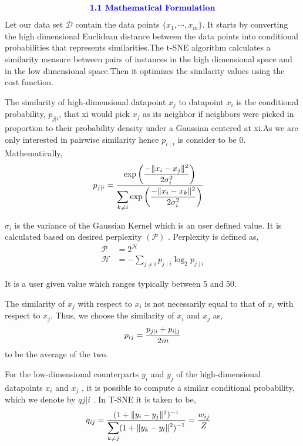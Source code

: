 \documentclass[12pt,a4paper]{article}
\begin{document}
{\begin{align*}
    \textcolor{blue}{\text{{\textbf{1.1 Mathematical Formulation}}}}
\end{align*}
Let our data set $\mathcal{D}$ contain the data points $\{x_1,\cdots,x_m\}$. It starts by converting the high dimensional Euclidean distance between the data points into conditional probabilities that represents similarities.The t-SNE algorithm calculates a similarity measure between pairs of instances in the high dimensional space and in the low dimensional space.Then it optimizes the similarity values using the cost function.

The similarity of high-dimensional datapoint $x_j$ to datapoint $x_i$ is the conditional probability, $p_{j|i}$, that xi would pick $x_j$ as its neighbor if neighbors were picked in proportion to their probability density under a Gaussian centered at xi.As we are only interested in pairwise similarity hence $p_{i\mid i}$ is consider to be $0$. Mathematically,
\begin{align*}
p_{j\mid i} &= {\displaystyle\exp\bigg({-\|x_i-x_j\|^2\over 2 \sigma_i^2}\bigg) \over \displaystyle\sum_{k\ne i}\exp\bigg({-\|x_i-x_k\|^2\over 2 \sigma_i^2}\bigg) }
\end{align*}

$\sigma_i$ is the variance of the Gaussian Kernel which is an user defined value. It is calculated based on desired perplexity $(\mathcal{P})$ . Perplexity is defined as,
\begin{align*}
    \mathcal{P} &= 2^{\mathcal{H}}\\
    \mathcal{H} &= -\sum_{j\ne i}p_{j\mid i}\log_2p_{j\mid i}
\end{align*}

It is a user given value which ranges typically between 5 and 50.

The similarity of $x_j$ with respect to $x_i$ is not necessarily equal to that of $x_i$ with respect to $x_j$. Thus, we choose the similarity of $x_i$ and $x_j$ as,
\begin{align*}
    p_{ij} = {p_{j\mid i}+p_{i\mid j}\over 2m}
\end{align*}
to be the average of the two.

For the low-dimensional counterparts $y_i$ and $y_j$ of the high-dimensional datapoints $x_i$ and $x_j$ , it is possible to compute a similar conditional probability, which we denote by $q{j|i}$ . In T-SNE it is taken to be,
\begin{align*}
q_{ij} &= {(1 + \|y_i-y_j\|^2)^{-1}\over \displaystyle\sum_{k\ne j}(1+\|y_k-y_l\|^2)^{-1}} = {w_{ij}\over Z}
\end{align*}

}
\end{document}
